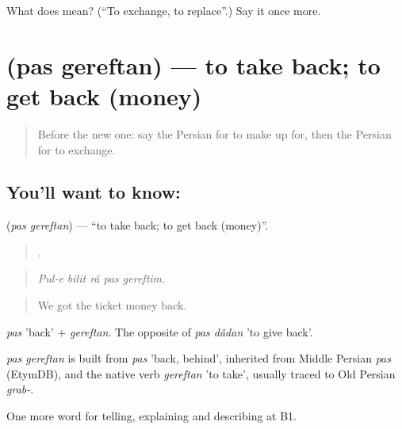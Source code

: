 \begin{tcolorbox}[breakable,colback=teal!4,colframe=teal!35!black,title={Before you move on}]
What does   mean? (\textquotedblleft{}To exchange, to replace\textquotedblright{}.) Say it once more.
\end{tcolorbox}
\section[\texorpdfstring{\fa{پس} \fa{گرفتن} (pas gereftan)}{پس گرفتن (pas gereftan)}]{  (pas gereftan) — to take back; to get back (money)}

\label{lesson:FA-C442-pas-gereftan}



\begin{quote}
Before the new one: say the Persian for to make up for, then the Persian for to exchange.
\end{quote}

\subsection*{You'll want to know:  }
\textbf{ } (\emph{pas gereftan}) — \textquotedblleft{}to take back; to get back (money)\textquotedblright{}.

\begin{quote}
    .
\end{quote}

\begin{quote}
\emph{Pul-e bilit râ pas gereftim.}
\end{quote}

\begin{quote}
We got the ticket money back.
\end{quote}

\emph{pas} 'back' + \emph{gereftan}. The opposite of \emph{pas dâdan} 'to give back'.

\begin{cousinweb}
\emph{pas gereftan} is built from \emph{pas} 'back, behind', inherited from Middle Persian \emph{pas} (EtymDB), and the native verb \emph{gereftan} 'to take', usually traced to Old Persian \emph{grab-}.
\end{cousinweb}

\begin{grammarlens}[title={What you've built}]
One more word for telling, explaining and describing at B1.
\end{grammarlens}

